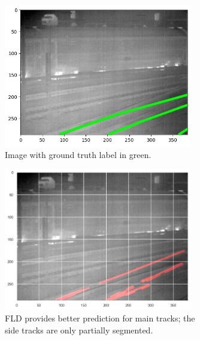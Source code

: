 \documentclass[Master,MDS,english]{BASE/twbook} %
\begin{document}
\begin{figure}
\centering
\begin{subfigure}[t]{.33\textwidth}
  \centering
  \includegraphics[width=0.9\textwidth]{images/results/example1_gt}
  \caption{Image with ground truth label in green.}
\end{subfigure}%
\begin{subfigure}[t]{.33\textwidth}
  \centering
  \includegraphics[width=0.9\textwidth]{images/results/example1_fld}
  \caption{FLD provides better prediction for main tracks; the side tracks are only partially segmented.}
\end{subfigure}%
\begin{subfigure}[t]{.33\textwidth}
  \centering

\end{subfigure}
\end{figure}
\end{document}
